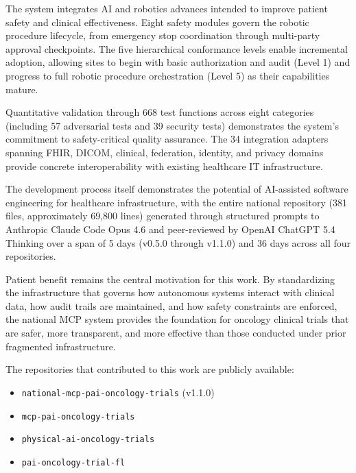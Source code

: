 \documentclass{article}
\begin{document}
The system integrates AI and robotics advances intended to improve patient safety and clinical effectiveness. Eight safety modules govern the robotic procedure lifecycle, from emergency stop coordination through multi-party approval checkpoints. The five hierarchical conformance levels enable incremental adoption, allowing sites to begin with basic authorization and audit (Level 1) and progress to full robotic procedure orchestration (Level 5) as their capabilities mature.

Quantitative validation through 668 test functions across eight categories (including 57 adversarial tests and 39 security tests) demonstrates the system's commitment to safety-critical quality assurance. The 34 integration adapters spanning FHIR, DICOM, clinical, federation, identity, and privacy domains provide concrete interoperability with existing healthcare IT infrastructure.

The development process itself demonstrates the potential of AI-assisted software engineering for healthcare infrastructure, with the entire national repository (381 files, approximately 69,800 lines) generated through structured prompts to Anthropic Claude Code Opus 4.6 and peer-reviewed by OpenAI ChatGPT 5.4 Thinking over a span of 5 days (v0.5.0 through v1.1.0) and 36 days across all four repositories.

Patient benefit remains the central motivation for this work. By standardizing the infrastructure that governs how autonomous systems interact with clinical data, how audit trails are maintained, and how safety constraints are enforced, the national MCP system provides the foundation for oncology clinical trials that are safer, more transparent, and more effective than those conducted under prior fragmented infrastructure.

The repositories that contributed to this work are publicly available:
\begin{itemize}[leftmargin=*]
\item \texttt{national-mcp-pai-oncology-trials} (v1.1.0)~\cite{kawchak2026national}
\item \texttt{mcp-pai-oncology-trials}~\cite{kawchak2026trialmcp}
\item \texttt{physical-ai-oncology-trials}~\cite{kawchak2026physicalai}
\item \texttt{pai-oncology-trial-fl}~\cite{kawchak2026paifl}
\end{itemize}



\end{document}
